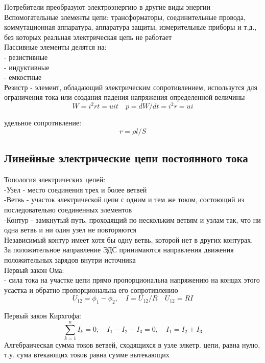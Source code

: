\documentclass[a4paper, 12pt]{article}
\begin{document}
Потребители преобразуют электроэнергию в другие виды энергии\\

Вспомогательные элементы цепи: трансформаторы, соединительные провода, коммутационная аппаратура, аппаратура защиты, измерительные приборы и т.д., без которых реальная электрическая цепь не работает\\

Пассивные элементы делятся на:\\
- резистивные\\
- индуктивные\\
- емкостные\\

Резистр - элемент, обладающий электрическим сопротивлением, использутся для ограничения тока или создания падения напряжения определенной величины\\
\[
	W = i^2rt = uit \quad p = dW/dt = i^2 r =ui
\]

удельное сопротивление:
\[
	r = \rho l/S
\]
\newpage
\subsection{Линейные электрические цепи постоянного тока}
Топология электрических цепей:\\
-Узел - место соединения трех и более ветвей\\
-Ветвь - участок электрической цепи с одним и тем же током, состоющий из последовательно соединенных элементов\\
-Контур - замкнутый путь, проходящий по нескольким ветвям и узлам так, что ни одна ветвь и ни один узел не повторяются\\

Независимый контур имеет хотя бы одну ветвь, которой нет в других контурах.\\

За положительное направление ЭДС принимаются направления движения положительных зарядов внутри источника\\


Первый закон Ома:\\
- сила тока на участке цепи прямо пропорциональна напряжению на концах этого усастка и обратно пропорциональна его сопротивлению
\[
	U_{12} = \phi_1 - \phi_2, \quad I = U_{12}/R \quad U_{12} = RI
\]

Первый закон Кирхгофа:\\
\[
	\sum_{k=1}^{n} I_k = 0, \quad I_1 - I_2 - I_3 = 0, \quad I_1 = I_2 + I_3 
\]
Алгебраическая сумма токов ветвей, сходящихся в узле элкетр. цепи, равна нулю, т.у. сума втекающих токов равна сумме вытекающих\\
\end{document}
